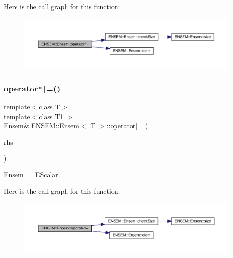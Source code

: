 Here is the call graph for this function\+:
\nopagebreak
\begin{figure}[H]
\begin{center}
\leavevmode
\includegraphics[width=350pt]{d7/d3e/classENSEM_1_1Ensem_a7f9a469a80ccb509892aef8d356fd81e_cgraph}
\end{center}
\end{figure}
\mbox{\label{classENSEM_1_1Ensem_aa0c3f80e393be46c6f0a1cb3bbdfb170}} 
\subsubsection{\texorpdfstring{operator\texttt{"|}=()}{operator|=()}\hspace{0.1cm}{\footnotesize\ttfamily [1/3]}}
{\footnotesize\ttfamily template$<$class T$>$ \\
template$<$class T1 $>$ \\
\mbox{\hyperlink{classENSEM_1_1Ensem}{Ensem}}\& \mbox{\hyperlink{classENSEM_1_1Ensem}{E\+N\+S\+E\+M\+::\+Ensem}}$<$ T $>$\+::operator$\vert$= (\begin{DoxyParamCaption}\item[{const \mbox{\hyperlink{classENSEM_1_1EScalar}{E\+Scalar}}$<$ T1 $>$ \&}]{rhs }\end{DoxyParamCaption})\hspace{0.3cm}{\ttfamily [inline]}}



\mbox{\hyperlink{classENSEM_1_1Ensem}{Ensem}} $\vert$= \mbox{\hyperlink{classENSEM_1_1EScalar}{E\+Scalar}}. 

Here is the call graph for this function\+:
\nopagebreak
\begin{figure}[H]
\begin{center}
\leavevmode
\includegraphics[width=350pt]{d7/d3e/classENSEM_1_1Ensem_aa0c3f80e393be46c6f0a1cb3bbdfb170_cgraph}
\end{center}
\end{figure}
\mbox{\label{classENSEM_1_1Ensem_aa0c3f80e393be46c6f0a1cb3bbdfb170}} 
